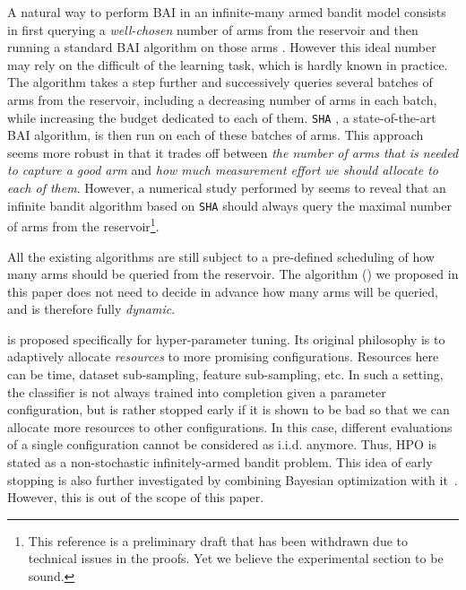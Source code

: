 A natural way to perform  BAI in an infinite-many armed bandit model consists in first querying a \emph{well-chosen} number of arms from the reservoir and then running a standard BAI algorithm on those arms \citep{carpentier2015siri}. However this ideal number may rely on the difficult of the learning task, which is hardly known in practice. The \Hyperband{} algorithm \citep{li2017hyperband} takes a step further and successively queries several batches of arms from the reservoir, including a decreasing number of arms in each batch, while increasing the budget dedicated to each of them. \texttt{SHA} \citep{karnin2013sha}, a state-of-the-art BAI algorithm, is then run on each of these batches of arms. This approach seems more robust in that it trades off between \emph{the number of arms that is needed to capture a good arm} and \emph{how much measurement effort we should allocate to each of them}. However, a numerical study performed by \cite{aziz2018infinite} seems to reveal that an infinite bandit algorithm based on \texttt{SHA} should always query the maximal number of arms from the reservoir\footnote{This reference is a preliminary draft that has been withdrawn due to technical issues in the proofs. Yet we believe the experimental section to be sound.}. 

All the existing algorithms are still subject to a pre-defined scheduling of how many arms should be queried from the reservoir. The algorithm (\DTTTS) we proposed in this paper does not need to decide in advance how many arms will be queried, and is therefore fully \emph{dynamic}. %

\begin{remark}
\Hyperband is proposed specifically for hyper-parameter tuning. Its original philosophy is to adaptively allocate \emph{resources} to more promising configurations. Resources here can be time, dataset sub-sampling, feature sub-sampling, etc. In such a setting, the classifier is not always trained into completion given a parameter configuration, but is rather stopped early if it is shown to be bad so that we can allocate more resources to other configurations. In this case, different evaluations of a single configuration cannot be considered as i.i.d. anymore. Thus, HPO is stated as a non-stochastic infinitely-armed bandit problem. This idea of early stopping is also further investigated by combining Bayesian optimization with it~\citep{falkner2018bohb}. However, this is out of the scope of this paper.
\end{remark}
